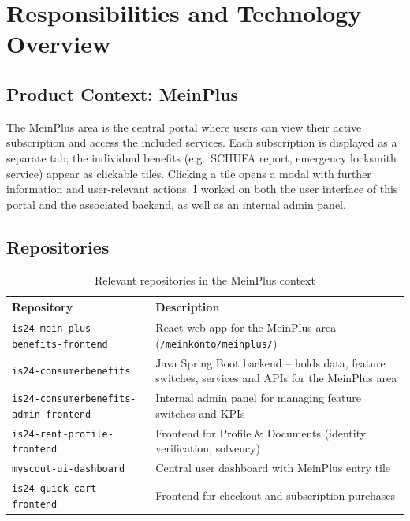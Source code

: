 \documentclass[a4paper, 12pt]{article}
\let\oldsection\section
\renewcommand{\section}{\clearpage\oldsection}
\begin{document}
\section{Responsibilities and Technology Overview}

\subsection{Product Context: MeinPlus}

The MeinPlus area is the central portal where users can view their active subscription
and access the included services. Each subscription is displayed as a separate tab;
the individual benefits (e.g.\ SCHUFA report, emergency locksmith service) appear as
clickable tiles. Clicking a tile opens a modal with further information and
user-relevant actions. I worked on both the user interface of this portal and the
associated backend, as well as an internal admin panel.

\subsection{Repositories}

\begin{table}[H]
  \centering
  \begin{tabularx}{\textwidth}{lX}
    \toprule
    \textbf{Repository} & \textbf{Description} \\
    \midrule
    \texttt{is24-mein-plus-benefits-frontend}      & React web app for the MeinPlus area (\texttt{/meinkonto/meinplus/}) \\
    \texttt{is24-consumerbenefits}                 & Java Spring Boot backend -- holds data, feature switches, services and APIs for the MeinPlus area \\
    \texttt{is24-consumerbenefits-admin-frontend}  & Internal admin panel for managing feature switches and KPIs \\
    \texttt{is24-rent-profile-frontend}            & Frontend for Profile \& Documents (identity verification, solvency) \\
    \texttt{myscout-ui-dashboard}                  & Central user dashboard with MeinPlus entry tile \\
    \texttt{is24-quick-cart-frontend}              & Frontend for checkout and subscription purchases \\
    \bottomrule
  \end{tabularx}
  \caption{Relevant repositories in the MeinPlus context}
\end{table}
\end{document}
